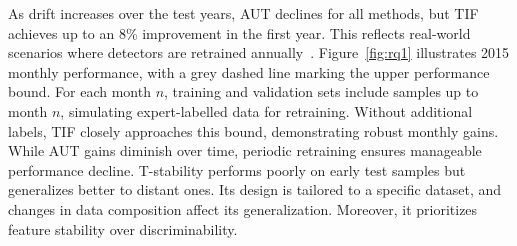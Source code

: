
As drift increases over the test years, AUT declines for all methods, but TIF achieves up to an 8\% improvement in the first year. This reflects real-world scenarios where detectors are retrained annually~\cite{apigraph}. Figure~\ref{fig:rq1} illustrates 2015 monthly performance, with a grey dashed line marking the upper performance bound. For each month $n$, training and validation sets include samples up to month $n$, simulating expert-labelled data for retraining. Without additional labels, TIF closely approaches this bound, demonstrating robust monthly gains. While AUT gains diminish over time, periodic retraining ensures manageable performance decline. T-stability performs poorly on early test samples but generalizes better to distant ones. Its design is tailored to a specific dataset, and changes in data composition affect its generalization. Moreover, it prioritizes feature stability over discriminability.




